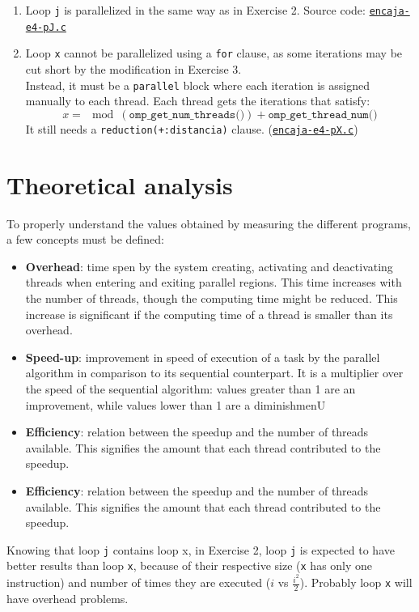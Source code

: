 \documentclass[a4paper]{article}
\newcommand{\github}{https://github.com/kauron/etsinf3/tree/master/CPA/lab2}
\newcommand{\gitline}[2]{\texttt{\href{\github /src/#1#2}{#1}}}
\begin{document}
\begin{enumerate}
\begin{enumerate}
        \item Loop \texttt{j} is parallelized in the same way as in Exercise 2. Source code: \gitline{encaja-e4-pJ.c}{\#L118}
        \item Loop \texttt{x} cannot be parallelized using a \texttt{for} clause, as some iterations may be cut short by the modification in Exercise 3.\\ Instead, it must be a \texttt{parallel} block where each iteration is assigned manually to each thread. Each thread gets the iterations that satisfy: $$x = \mod(\texttt{omp\_get\_num\_threads()}) + \texttt{omp\_get\_thread\_num()}$$ It still needs a \texttt{reduction(+:distancia)} clause. (\gitline{encaja-e4-pX.c}{\#L120})
    \end{enumerate}
\end{enumerate}

\section{Theoretical analysis}
\label{sec:theoretical}
To properly understand the values obtained by measuring the different programs, a few concepts must be defined:
\begin{itemize}
	\item \textbf{Overhead}: time spen by the system creating, activating and deactivating threads when entering and exiting parallel regions. This time increases with the number of threads, though the computing time might be reduced. This increase is significant if the computing time of a thread is smaller than its overhead.
	\item \textbf{Speed-up}: improvement in speed of execution of a task by the parallel algorithm in comparison to its sequential counterpart. It is a multiplier over the speed of the sequential algorithm: values greater than 1 are an improvement, while values lower than 1 are a diminishmenU\item \textbf{Efficiency}: relation between the speedup and the number of threads available. This signifies the amount that each thread contributed to the speedup.
	\item \textbf{Efficiency}: relation between the speedup and the number of threads available. This signifies the amount that each thread contributed to the speedup.
\end{itemize}

Knowing that loop \texttt{j} contains loop {x}, in Exercise 2, loop \texttt{j} is expected to have better results than loop \texttt{x}, because of their respective size (\texttt{x} has only one instruction) and number of times they are executed ($i$ vs $\frac{i^2}{2}$). Probably loop \texttt{x} will have overhead problems.
\end{document}
